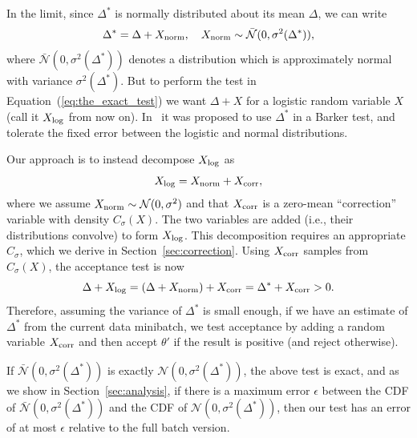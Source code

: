 \documentclass[twoside]{article} \usepackage{aistats2017}
\begin{document}
In the limit, since $\Delta^*$ is normally distributed about its mean $\Delta$,
we can write
\begin{equation}\label{eq:relationship}
    \Delta^* = \Delta + X_{\rm norm}, \quad X_{\rm norm} \sim \mathcal{\bar{N}}(0, \sigma^2(\Delta^*)),
\end{equation}
where $\mathcal{\bar{N}}(0, \sigma^2(\Delta^*))$ denotes a distribution which is
approximately normal with variance $\sigma^2(\Delta^*)$.  But to perform the
test in Equation~(\ref{eq:the_exact_test}) we want $\Delta + X$ for a logistic
random variable $X$ (call it $X_{\rm log}$ from now on). In~\citet{TallData15} it
was proposed to use $\Delta^*$ in a Barker test, and tolerate the fixed
error between the logistic and normal distributions. 

Our approach is to instead decompose $X_{\rm log}$ as
\begin{equation}\label{eq:deconvolution}
    X_{\rm log} = X_{\rm norm}+X_{\rm corr},
\end{equation}
where we assume $X_{\rm norm} \sim \mathcal{N}(0, \sigma^2)$ and that $X_{\rm
corr}$ is a zero-mean ``correction'' variable with density $C_{\sigma}(X)$.  The
two variables are added (i.e., their distributions convolve) to form $X_{\rm
log}$.  This decomposition requires an appropriate $C_\sigma$, which we derive
in Section~\ref{sec:correction}. Using $X_{\rm corr}$ samples from
$C_{\sigma}(X)$, the acceptance test is now
\begin{equation}\label{eq:criteria}
    \Delta + X_{\rm log} = (\Delta + X_{\rm norm}) + X_{\rm corr} = \Delta^* + X_{\rm corr} >0.
\end{equation}
Therefore, assuming the variance of $\Delta^*$ is small enough, if we have an
estimate of $\Delta^*$ from the current data minibatch, we test acceptance by
adding a random variable $X_{\rm corr}$ and then accept $\theta'$ if the result
is positive (and reject otherwise).

If $\mathcal{\bar{N}}(0, \sigma^2(\Delta^*))$ is exactly $\mathcal{N}(0,
\sigma^2(\Delta^*))$, the above test is exact, and as we show in
Section~\ref{sec:analysis}, if there is a maximum error $\epsilon$ between the
CDF of $\mathcal{\bar{N}}(0, \sigma^2(\Delta^*))$ and the CDF of $\mathcal{N}(0,
\sigma^2(\Delta^*))$, then our test has an error of at most $\epsilon$ relative
to the full batch version.



\end{document}
